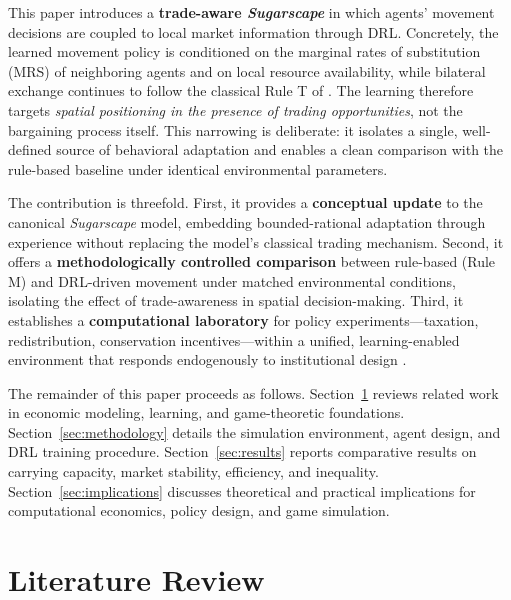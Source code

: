 \documentclass[pdflatex,sn-mathphys-num]{sn-jnl}%
\theoremstyle{thmstyleone}%
\theoremstyle{thmstyletwo}%
\theoremstyle{thmstylethree}%
\begin{document}
This paper introduces a \textbf{trade-aware \textit{Sugarscape}} in which agents' movement decisions are coupled to local market information through DRL.  
Concretely, the learned movement policy is conditioned on the marginal rates of substitution (MRS) of neighboring agents and on local resource availability, while bilateral exchange continues to follow the classical Rule T of \citet{EpsteinAxtell1996}.  
The learning therefore targets \emph{spatial positioning in the presence of trading opportunities}, not the bargaining process itself.  
This narrowing is deliberate: it isolates a single, well-defined source of behavioral adaptation and enables a clean comparison with the rule-based baseline under identical environmental parameters.

The contribution is threefold.  
First, it provides a \textbf{conceptual update} to the canonical \textit{Sugarscape} model, embedding bounded-rational adaptation through experience \citep{Simon1957} without replacing the model's classical trading mechanism.  
Second, it offers a \textbf{methodologically controlled comparison} between rule-based (Rule M) and DRL-driven movement under matched environmental conditions, isolating the effect of trade-awareness in spatial decision-making.  
Third, it establishes a \textbf{computational laboratory} for policy experiments---taxation, redistribution, conservation incentives---within a unified, learning-enabled environment that responds endogenously to institutional design \citep{Tesfatsion2017}.

The remainder of this paper proceeds as follows.  
Section~\ref{sec:literature} reviews related work in economic modeling, learning, and game-theoretic foundations.  
Section~\ref{sec:methodology} details the simulation environment, agent design, and DRL training procedure.  
Section~\ref{sec:results} reports comparative results on carrying capacity, market stability, efficiency, and inequality.  
Section~\ref{sec:implications} discusses theoretical and practical implications for computational economics, policy design, and game simulation.


\section{Literature Review}
\label{sec:literature}

\end{document}
